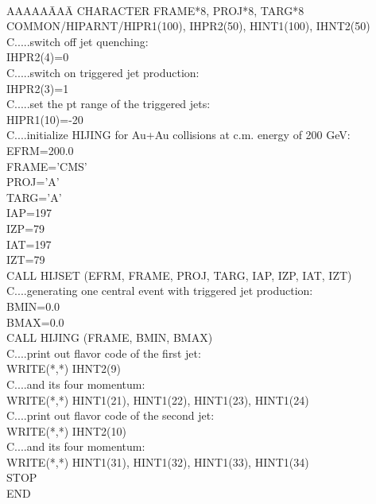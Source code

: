 {\tt
\begin{tabbing}
AAAAA\=AAA\=  \kill
        \> \>CHARACTER FRAME*8, PROJ*8, TARG*8 \\
\>\>    COMMON/HIPARNT/HIPR1(100), IHPR2(50), HINT1(100), IHNT2(50) \\
C.....switch off jet quenching: \>\> \\
\>\>    IHPR2(4)=0 \\
C.....switch on triggered jet production: \>\>\\
\>\>    IHPR2(3)=1 \\
C.....set the pt range of the triggered jets: \>\> \\
\>\>    HIPR1(10)=-20 \\
C....initialize HIJING for Au+Au collisions at c.m. energy of 200 GeV: \> \>\\
\>\>    EFRM=200.0 \\
\>\>    FRAME='CMS' \\
\>\>    PROJ='A' \\
\>\>    TARG='A' \\
\>\>    IAP=197 \\
\>\>    IZP=79 \\
\>\>    IAT=197 \\
\>\>    IZT=79 \\
\>\>    CALL HIJSET (EFRM, FRAME, PROJ, TARG, IAP, IZP, IAT, IZT) \\
C....generating one central event with triggered jet production:\>\> \\
\>\>    BMIN=0.0 \\
\>\>    BMAX=0.0 \\
\>\>    CALL HIJING (FRAME, BMIN, BMAX) \\
C....print out flavor code of the first jet:\>\> \\ 
\>\>    WRITE(*,*) IHNT2(9) \\
C....and its four momentum:\>\> \\
\>\>    WRITE(*,*) HINT1(21), HINT1(22), HINT1(23), HINT1(24) \\
C....print out flavor code of the second jet:\>\> \\ 
\>\>    WRITE(*,*) IHNT2(10) \\
C....and its four momentum:\>\> \\
\>\>    WRITE(*,*) HINT1(31), HINT1(32), HINT1(33), HINT1(34) \\
\>\>    STOP \\
\>\>    END
\end{tabbing}
                }



